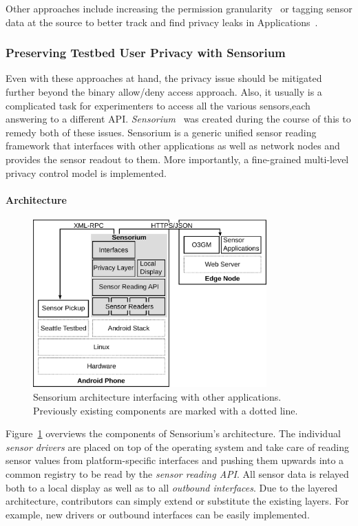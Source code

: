 Other approaches include increasing the permission granularity~\cite{Jeon:2012:DAM:2381934.2381938} or tagging sensor data at the source to better track and find privacy leaks in Applications~\cite{enck2010taintdroid}.


\subsubsection{Preserving Testbed User Privacy with Sensorium}

Even with these approaches at hand, the privacy issue should be mitigated further beyond the binary allow/deny access approach. Also, it usually is a complicated task for experimenters to access all the various sensors,each answering to a different \gls{API}. \textit{Sensorium}~\cite{raf2013sensorium} was created during the course of this to remedy both of these issues. Sensorium is a generic unified sensor reading framework that interfaces with other applications as well as network nodes and provides the sensor readout to them. More importantly, a fine-grained multi-level privacy control model is implemented.


\paragraph{Architecture}

\begin{figure}[htb]
	\centering
	\includegraphics[width=0.8\textwidth]{images/sensorium-arch.pdf}
	\caption{Sensorium architecture interfacing with other applications. Previously existing components are marked with a dotted line.}
\label{c5:fig:architecture}
\end{figure}

Figure~\ref{c5:fig:architecture} overviews the components of Sensorium's architecture. The individual \textit{sensor drivers} are placed on top of the operating system and take care of reading sensor values from platform-specific interfaces and pushing them upwards into a common registry to be read by the \textit{sensor reading \gls{API}}. All sensor data is relayed both to a local display as well as to all \textit{outbound interfaces}. Due to the layered architecture, contributors can simply extend or substitute the existing layers. For example, new drivers or outbound interfaces can be easily implemented. 


